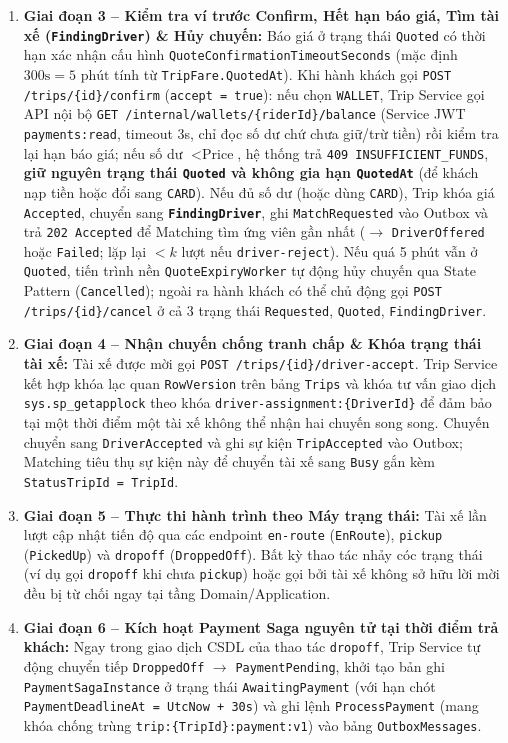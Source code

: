 \documentclass[12pt,a4paper]{article}
\begin{document}
\begin{enumerate}[leftmargin=1.6em]
    \item \textbf{Giai đoạn 3 -- Kiểm tra ví trước Confirm, Hết hạn báo giá, Tìm tài xế (\texttt{FindingDriver}) \& Hủy chuyến:} Báo giá ở trạng thái \texttt{Quoted} có thời hạn xác nhận cấu hình \texttt{QuoteConfirmationTimeoutSeconds} (mặc định $300\text{s} = 5\text{ phút}$ tính từ \texttt{TripFare.QuotedAt}). Khi hành khách gọi \texttt{POST /trips/\{id\}/confirm} (\texttt{accept = true}): nếu chọn \texttt{WALLET}, Trip Service gọi API nội bộ \texttt{GET /internal/wallets/\{riderId\}/balance} (Service JWT \texttt{payments:read}, timeout 3s, chỉ đọc số dư chứ chưa giữ/trừ tiền) rồi kiểm tra lại hạn báo giá; nếu số dư $< \text{Price}$, hệ thống trả \texttt{409 INSUFFICIENT\_FUNDS}, \textbf{giữ nguyên trạng thái \texttt{Quoted} và không gia hạn \texttt{QuotedAt}} (để khách nạp tiền hoặc đổi sang \texttt{CARD}). Nếu đủ số dư (hoặc dùng \texttt{CARD}), Trip khóa giá \texttt{Accepted}, chuyển sang \textbf{\texttt{FindingDriver}}, ghi \texttt{MatchRequested} vào Outbox và trả \texttt{202 Accepted} để Matching tìm ứng viên gần nhất ($\rightarrow$ \texttt{DriverOffered} hoặc \texttt{Failed}; lặp lại $< k$ lượt nếu \texttt{driver-reject}). Nếu quá 5 phút vẫn ở \texttt{Quoted}, tiến trình nền \texttt{QuoteExpiryWorker} tự động hủy chuyến qua State Pattern (\texttt{Cancelled}); ngoài ra hành khách có thể chủ động gọi \texttt{POST /trips/\{id\}/cancel} ở cả 3 trạng thái \texttt{Requested}, \texttt{Quoted}, \texttt{FindingDriver}.
    \item \textbf{Giai đoạn 4 -- Nhận chuyến chống tranh chấp \& Khóa trạng thái tài xế:} Tài xế được mời gọi \texttt{POST /trips/\{id\}/driver-accept}. Trip Service kết hợp khóa lạc quan \texttt{RowVersion} trên bảng \texttt{Trips} và khóa tư vấn giao dịch \texttt{sys.sp\_getapplock} theo khóa \texttt{driver-assignment:\{DriverId\}} để đảm bảo tại một thời điểm một tài xế không thể nhận hai chuyến song song. Chuyến chuyển sang \texttt{DriverAccepted} và ghi sự kiện \texttt{TripAccepted} vào Outbox; Matching tiêu thụ sự kiện này để chuyển tài xế sang \texttt{Busy} gắn kèm \texttt{StatusTripId = TripId}.
    \item \textbf{Giai đoạn 5 -- Thực thi hành trình theo Máy trạng thái:} Tài xế lần lượt cập nhật tiến độ qua các endpoint \texttt{en-route} (\texttt{EnRoute}), \texttt{pickup} (\texttt{PickedUp}) và \texttt{dropoff} (\texttt{DroppedOff}). Bất kỳ thao tác nhảy cóc trạng thái (ví dụ gọi \texttt{dropoff} khi chưa \texttt{pickup}) hoặc gọi bởi tài xế không sở hữu lời mời đều bị từ chối ngay tại tầng Domain/Application.
    \item \textbf{Giai đoạn 6 -- Kích hoạt Payment Saga nguyên tử tại thời điểm trả khách:} Ngay trong giao dịch CSDL của thao tác \texttt{dropoff}, Trip Service tự động chuyển tiếp \texttt{DroppedOff} $\rightarrow$ \texttt{PaymentPending}, khởi tạo bản ghi \texttt{PaymentSagaInstance} ở trạng thái \texttt{AwaitingPayment} (với hạn chót \texttt{PaymentDeadlineAt = UtcNow + 30s}) và ghi lệnh \texttt{ProcessPayment} (mang khóa chống trùng \texttt{trip:\{TripId\}:payment:v1}) vào bảng \texttt{OutboxMessages}.

\end{enumerate}
\end{document}
